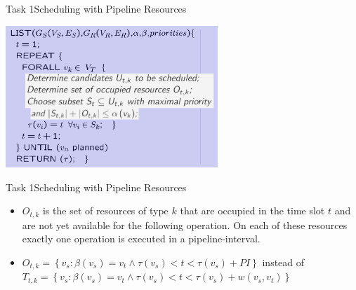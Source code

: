 \begin{frame}[fragile]{Task 1}{Scheduling with Pipeline Resources}
  \begin{solutionnoinc}
    \centering
    \includegraphics[width=0.6\textwidth]{./figures/list_scheduling.png}
  \end{solutionnoinc}
\end{frame}
\begin{frame}[fragile]{Task 1}{Scheduling with Pipeline Resources}
  \begin{solutionnoinc}
    \begin{itemize}
      \item $O_{t, k}$ is the set of resources of type $k$ that are occupied in the time slot $t$ and are not yet available for the following operation. On each of these resources exactly one operation is executed in a pipeline-interval.
      \item $O_{t, k} = \left\{v_s: \beta\left(v_s\right)=v_t \wedge \tau\left(v_s\right)<t<\tau\left(v_s\right)+PI\right\}$ instead of $T_{t, k} = \left\{v_s: \beta\left(v_s\right)=v_t \wedge \tau\left(v_s\right)<t<\tau\left(v_s\right)+w\left(v_s, v_t\right)\right\}$
    \end{itemize}
  \end{solutionnoinc}
\end{frame}
